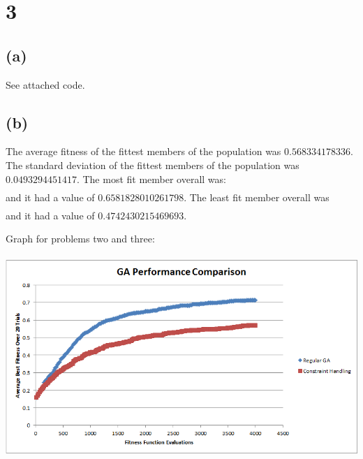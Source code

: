 \documentclass[12pt]{article}
\begin{document}
\section{3}
\subsection{(a)}
See attached code.

\subsection{(b)}
The average fitness of the fittest members of the population was $0.568334178336$.  The standard deviation of the fittest members of the population was $0.0493294451417$.  The most fit member overall was:
\begin{align*} 
[3.2192452719665274, 3.1752263810653747, 3.3391066790724357, 3.0699177077612285,\\ 3.2767720905604634, 0.44277532656624796, 3.040299782122242, 3.2914751565371816,\\ 3.3073830752841777, 2.8941620504517847, 2.20417127826211, 0.25248928510518076,\\ 0.4174249174304465, 0.5029422220182223, 0.05775107009324282, 0.30699893367216624,\\ 0.4748142394786834, 0.36139033193565867, 0.36031050287714694, 0.7728398171231345]
\end{align*}
and it had a value of $0.6581828010261798$.  The least fit member overall was
\begin{align*}
[2.403178454838199, 0.33434678016001496, 3.111555871678033, 3.332531462978563,\\ 4.656845412954224, 3.41922063881561, 2.99654482242923, 0.3360796847780704,\\ 0.9428552414215912, 3.3022903545666082, 0.5311193521156884, 0.19765493674257806,\\ 2.4414923972041658, 0.2738397544478779, 0.08654813985261467, 2.7958082492484344,\\ 0.3913211802708072, 0.8773211370251517, 0.22628537805110427, 2.1291493186450428]
\end{align*}
and it had a value of $0.4742430215469693$.

\pagebreak
Graph for problems two and three:\\\\
\includegraphics[width=\textwidth]{ga_performance_graph.png}
\end{document}
